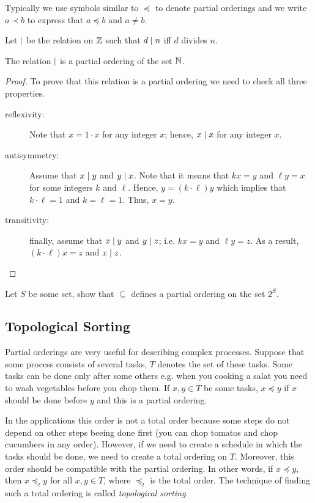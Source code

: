 Typically we use symbols similar to $\preceq$ to denote partial orderings and we
write $a \prec b$ to express that $a \preceq b$ and $a \neq b$.

Let $\mid$ be the relation on $\mathbb{Z}$ such that $d \mid n$ iff $d$
divides $n$.
\begin{theorem}
  The relation $\mid$ is a partial ordering of the set $\mathbb{N}$.
\end{theorem}
\begin{proof}
  To prove that this relation is a partial ordering we need to check all three
  properties.
  \begin{description}
    \item[reflexivity:] Note that $x = 1 \cdot x$ for any integer $x$;
      hence, $x \mid x$ for any integer $x$.
    \item[antisymmetry:] Assume that $x \mid y$ and $y \mid x$. Note
      that it means that $k x = y$ and $\ell y = x$ for some integers $k$ and
      $\ell$. Hence, $y = (k \cdot \ell) y$ which implies that
      $k \cdot \ell = 1$ and $k = \ell = 1$. Thus, $x = y$.
    \item[transitivity:] finally, assume that $x \mid y$ and $y \mid z$;
    i.e. $k x = y$ and $\ell y = z$. As a result, $(k \cdot \ell) x = z$ and
    $x \mid z$.
  \end{description}
\end{proof}

\begin{exercise}
  Let $S$ be some set, show that $\subseteq$ defines a partial ordering on the
  set $2^S$.
\end{exercise}

\subsection{Topological Sorting}
Partial orderings are very useful for describing complex processes. Suppose
that some process consists of several tasks, $T$ denotes the set of these tasks.
Some tasks can be done only after some others e.g. when you cooking a salat you
need to wash vegetables before you chop them. If $x, y \in T$ be some tasks, $x
\preceq y$ if $x$ should be done before $y$ and this is a partial ordering.

In the applications this order is not a total order because some steps do not
depend on other steps beeing done first (you can chop tomatos and chop
cucumbers in any order). However, if we need to create a schedule in which the
tasks should be done, we need to create a total ordering on $T$. Moreover, this
order should be compatible with the partial ordering. In other words, if $x
\preceq y$, then $x \preceq_t y$ for all $x, y \in T$, where $\preceq_t$ is the
total order. The technique of finding such a total ordering is called
\textit{topological sorting}.

